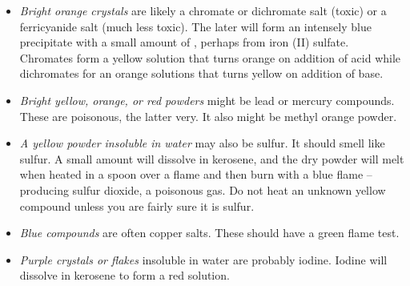 \begin{itemize}

\item{\emph{Bright orange crystals} are likely a chromate 
or dichromate salt (toxic) or a ferricyanide salt (much less toxic). 
The later will form an intensely blue precipitate 
with a small amount of , 
perhaps from iron (II) sulfate. 
Chromates form a yellow solution that turns orange 
on addition of acid while dichromates for an orange solutions 
that turns yellow on addition of base.}

\item{\emph{Bright yellow, 
orange, 
or red powders} might be lead or mercury compounds. 
These are poisonous, 
the latter very. 
It also might be methyl orange powder. }

\item{\emph{A yellow powder insoluble in water} may also be sulfur. 
It should smell like sulfur. 
A small amount will dissolve in kerosene, 
and the dry powder will melt when heated in a spoon 
over a flame and then burn with a blue flame -- 
producing sulfur dioxide, 
a poisonous gas. 
Do not heat an unknown yellow compound 
unless you are fairly sure it is sulfur.}

\item{\emph{Blue compounds} are often copper salts. 
These should have a green flame test.}

\item{\emph{Purple crystals or flakes} insoluble in water are probably iodine. 
Iodine will dissolve in kerosene to form a red solution.}


\end{itemize}
